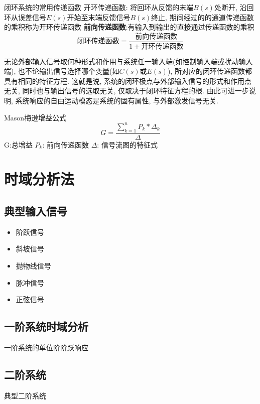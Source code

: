 \documentclass[openany]{book}
\begin{document}
闭环系统的常用传递函数\newline
开环传递函数: 将回环从反馈的末端$B(s)$处断开, 沿回环从误差信号$E(s)$开始至末端反馈信号$B(s)$终止, 期间经过的的通道传递函数的乘积称为开环传递函数\newline
\textbf{前向传递函数}:有输入到输出的直接通过传递函数的乘积
\begin{equation}
		\text{闭环传递函数} = \frac{\text{前向传递函数}}{1+\text{开环传递函数}}
\end{equation}

无论外部输入信号取何种形式和作用与系统任一输入端(如控制输入端或扰动输入端), 也不论输出信号选择哪个变量(如$C(s)$或$E(s)$), 所对应的闭环传递函数都具有相同的特征方程. \newline
这就是说, 系统的闭环极点与外部输入信号的形式和作用点无关, 同时也与输出信号的选取无关, 仅取决于闭环特征方程的根.\newline
由此可进一步说明, 系统响应的自由运动模态是系统的固有属性, 与外部激发信号无关.


Mason梅逊增益公式
\begin{equation}
		G = \frac{\sum_{k=1}^n P_k * \Delta_k}{\Delta}
\end{equation}
G:总增益\newline
$P_k$: 前向传递函数\newline
$\Delta$: 信号流图的特征式

\section{时域分析法}
\subsection{典型输入信号}
\begin{itemize}
	\item 阶跃信号
	\item 斜坡信号
	\item 抛物线信号
	\item 脉冲信号
	\item 正弦信号
\end{itemize}

\subsection{一阶系统时域分析}
一阶系统的单位阶阶跃响应
\subsection{二阶系统}
典型二阶系统
\end{document}
